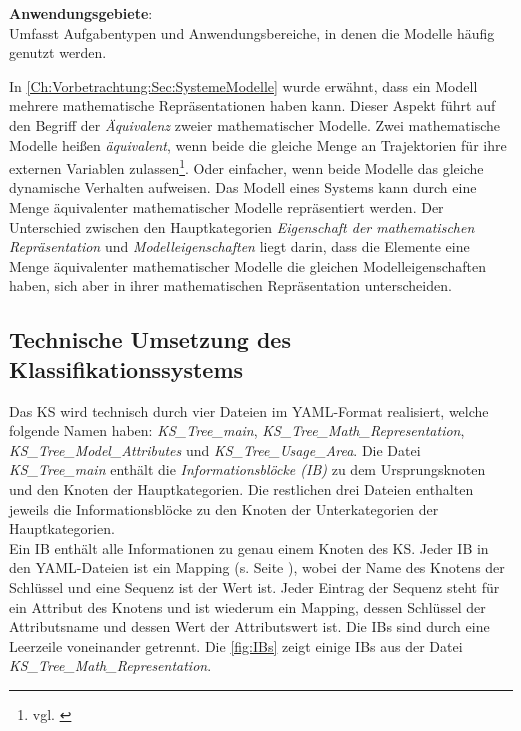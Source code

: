\textbf{Anwendungsgebiete}: \\
Umfasst Aufgabentypen und Anwendungsbereiche, in denen die Modelle häufig genutzt werden.

In \autoref{Ch:Vorbetrachtung:Sec:SystemeModelle} wurde erwähnt, dass ein Modell mehrere mathematische Repräsentationen haben kann. Dieser Aspekt führt auf den Begriff der \textit{Äquivalenz} zweier mathematischer Modelle. Zwei mathematische Modelle heißen \textit{äquivalent}, wenn beide die gleiche Menge an Trajektorien für ihre externen Variablen zulassen\footnote{vgl. \cite[S. 34]{SCH89}}. Oder einfacher, wenn beide Modelle das gleiche dynamische Verhalten aufweisen. Das Modell eines Systems kann durch eine Menge äquivalenter mathematischer Modelle repräsentiert werden. Der Unterschied zwischen den Hauptkategorien \textit{Eigenschaft der mathematischen Repräsentation} und \textit{Modelleigenschaften} liegt darin, dass die Elemente eine Menge äquivalenter mathematischer Modelle die gleichen Modelleigenschaften haben, sich aber in ihrer mathematischen Repräsentation unterscheiden.

\subsection{Technische Umsetzung des Klassifikationssystems}
\label{Ch:Ergebnisse:Sec:KS:SubSec:TechUmsetzung}
Das KS wird technisch durch vier Dateien im YAML-Format realisiert, welche folgende Namen haben: \textit{KS\_Tree\_main}, \textit{KS\_Tree\_Math\_Representation}, \textit{KS\_Tree\_Model\_Attributes} und \textit{KS\_Tree\_Usage\_Area}. Die Datei \textit{KS\_Tree\_main} enthält die \textit{Informationsblöcke (IB)} zu dem Ursprungsknoten und den Knoten der Hauptkategorien. Die restlichen drei Dateien enthalten jeweils die Informationsblöcke zu den Knoten der Unterkategorien der Hauptkategorien. \\ 
Ein IB enthält alle Informationen zu genau einem Knoten des KS. Jeder IB in den YAML-Dateien ist ein Mapping (s. Seite \pageref{YAML_Erklärung}), wobei der Name des Knotens der Schlüssel und eine Sequenz ist der Wert ist. Jeder Eintrag der Sequenz steht für ein Attribut des Knotens und ist wiederum ein Mapping, dessen Schlüssel der Attributsname und dessen Wert der Attributswert ist. Die IB\grq s sind durch eine Leerzeile voneinander getrennt. Die \autoref{fig:IBs} zeigt einige IB\grq s aus der Datei \textit{KS\_Tree\_Math\_Representation}.

